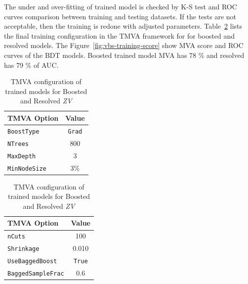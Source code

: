 The under and over-fitting of trained model is checked by \gls{K-S} test
and \gls{ROC} curves comparison between training and testing datasets.
If the tests are not acceptable, then the training is redone with adjusted parameters.
Table~\ref{tab:training-tmva-config} lists the final
training configuration in the \gls{TMVA} framework for
for boosted and resolved models.
The Figure~\ref{fig:vbs-training-score} show \gls{MVA} score and \gls{ROC} curves
of the BDT models. Boosted trained model \gls{MVA} has 78 \% and resolved
has 79 \% of \gls{AUC}.

\begin{table}[!ht]
  \centering
  \caption{TMVA configuration of trained models for Boosted and Resolved \textit{ZV}}
  \begin{tabular}{lc}%
    \toprule
    TMVA Option        & Value       \\
    \midrule\relax
    \verb|BoostType|   & \verb|Grad| \\
    \verb|NTrees|      & 800         \\
    \verb|MaxDepth|    & 3           \\
    \verb|MinNodeSize| & 3\%         \\
    \bottomrule
  \end{tabular}
  \quad
  \begin{tabular}{lc}%
    \toprule
    TMVA Option             & Value       \\
    \midrule\relax
    \verb|nCuts|            & 100         \\
    \verb|Shrinkage|        & 0.010       \\
    \verb|UseBaggedBoost|   & \verb|True| \\
    \verb|BaggedSampleFrac| & 0.6         \\
    \bottomrule
  \end{tabular}\label{tab:training-tmva-config}
\end{table}

